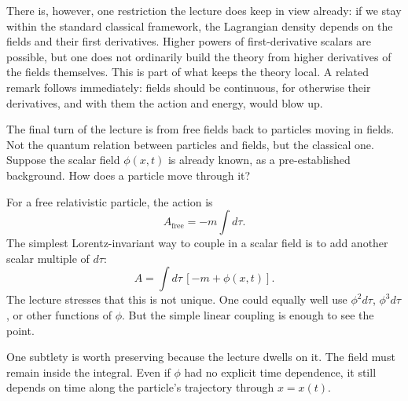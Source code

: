 There is, however, one restriction the lecture does keep in view already: if we stay within the standard classical framework, the Lagrangian density depends on the fields and their first derivatives. Higher powers of first-derivative scalars are possible, but one does not ordinarily build the theory from higher derivatives of the fields themselves. This is part of what keeps the theory local. A related remark follows immediately: fields should be continuous, for otherwise their derivatives, and with them the action and energy, would blow up.

The final turn of the lecture is from free fields back to particles moving in fields. Not the quantum relation between particles and fields, but the classical one. Suppose the scalar field \(\phi(x,t)\) is already known, as a pre-established background. How does a particle move through it?

For a free relativistic particle, the action is
\begin{equation}
A_{\mathrm{free}}=-m\int d\tau.
\end{equation}
The simplest Lorentz-invariant way to couple in a scalar field is to add another scalar multiple of \(d\tau\):
\begin{equation}
A=\int d\tau\,[-m+\phi(x,t)].
\end{equation}
The lecture stresses that this is not unique. One could equally well use \(\phi^2 d\tau\), \(\phi^3 d\tau\), or other functions of \(\phi\). But the simple linear coupling is enough to see the point.

One subtlety is worth preserving because the lecture dwells on it. The field must remain inside the integral. Even if \(\phi\) had no explicit time dependence, it still depends on time along the particle's trajectory through \(x=x(t)\).

